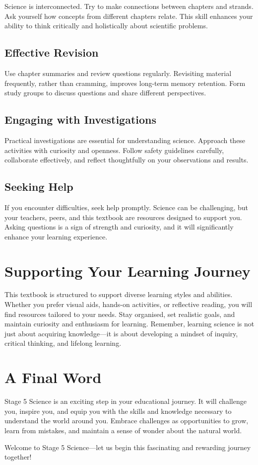 Science is interconnected. Try to make connections between chapters and strands. Ask yourself how concepts from different chapters relate. This skill enhances your ability to think critically and holistically about scientific problems.

\subsection{Effective Revision}

Use chapter summaries and review questions regularly. Revisiting material frequently, rather than cramming, improves long-term memory retention. Form study groups to discuss questions and share different perspectives.

\subsection{Engaging with Investigations}

Practical investigations are essential for understanding science. Approach these activities with curiosity and openness. Follow safety guidelines carefully, collaborate effectively, and reflect thoughtfully on your observations and results.

\subsection{Seeking Help}

If you encounter difficulties, seek help promptly. Science can be challenging, but your teachers, peers, and this textbook are resources designed to support you. Asking questions is a sign of strength and curiosity, and it will significantly enhance your learning experience.

\FloatBarrier

\section{Supporting Your Learning Journey}

This textbook is structured to support diverse learning styles and abilities. Whether you prefer visual aids, hands-on activities, or reflective reading, you will find resources tailored to your needs. Stay organised, set realistic goals, and maintain curiosity and enthusiasm for learning. Remember, learning science is not just about acquiring knowledge—it is about developing a mindset of inquiry, critical thinking, and lifelong learning.

\section{A Final Word}

Stage 5 Science is an exciting step in your educational journey. It will challenge you, inspire you, and equip you with the skills and knowledge necessary to understand the world around you. Embrace challenges as opportunities to grow, learn from mistakes, and maintain a sense of wonder about the natural world. 

Welcome to Stage 5 Science—let us begin this fascinating and rewarding journey together!

\FloatBarrier